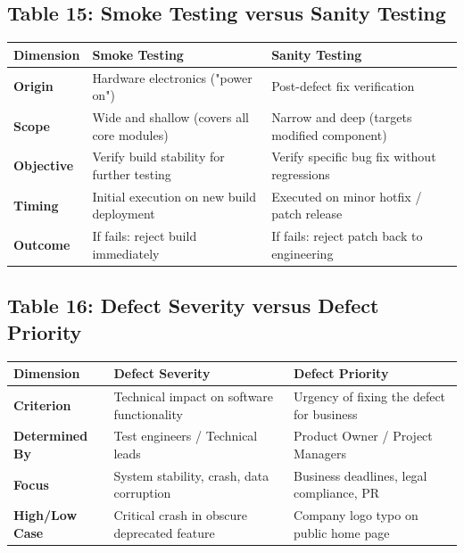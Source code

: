 \subsection*{Table 15: Smoke Testing versus Sanity Testing}
\begin{center}
\small
\begin{tabularx}{\textwidth}{lXX}
\toprule
\textbf{Dimension} & \textbf{Smoke Testing} & \textbf{Sanity Testing} \\
\midrule
\textbf{Origin} & Hardware electronics ("power on") & Post-defect fix verification \\
\textbf{Scope} & Wide and shallow (covers all core modules) & Narrow and deep (targets modified component) \\
\textbf{Objective} & Verify build stability for further testing & Verify specific bug fix without regressions \\
\textbf{Timing} & Initial execution on new build deployment & Executed on minor hotfix / patch release \\
\textbf{Outcome} & If fails: reject build immediately & If fails: reject patch back to engineering \\
\bottomrule
\end{tabularx}
\end{center}

\subsection*{Table 16: Defect Severity versus Defect Priority}
\begin{center}
\small
\begin{tabularx}{\textwidth}{lXX}
\toprule
\textbf{Dimension} & \textbf{Defect Severity} & \textbf{Defect Priority} \\
\midrule
\textbf{Criterion} & Technical impact on software functionality & Urgency of fixing the defect for business \\
\textbf{Determined By} & Test engineers / Technical leads & Product Owner / Project Managers \\
\textbf{Focus} & System stability, crash, data corruption & Business deadlines, legal compliance, PR \\
\textbf{High/Low Case} & Critical crash in obscure deprecated feature & Company logo typo on public home page \\
\bottomrule
\end{tabularx}
\end{center}


